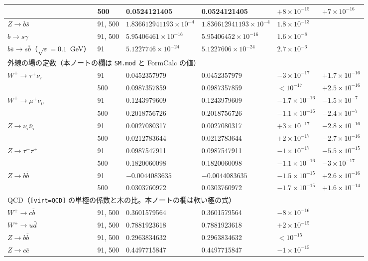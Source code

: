 \documentclass[a4paper,10pt]{ltjsarticle}
\begin{document}
\begin{table}[tbp]
\begin{tabular}{llllll}
 & 500 & 0.0524121405 & 0.0524121405 & $+8\times10^{-15}$ & $+7\times10^{-16}$ \\
\midrule
$Z\to b\bar s$ & 91, 500 & $1.836612941193\times10^{-4}$ & $1.836612941193\times10^{-4}$ & $1.8\times10^{-13}$ & \\
$b\to s\gamma$ & 91, 500 & $5.95406461\times10^{-16}$ & $5.95406452\times10^{-16}$ & $1.6\times10^{-8}$ & \\
$b\bar s\to s\bar b$（$\sqrt s=0.1$~GeV） & 91 & $5.1227746\times10^{-24}$ & $5.1227606\times10^{-24}$ & $2.7\times10^{-6}$ & \\
\midrule
\multicolumn{6}{l}{外線の場の定数（本ノートの欄は \texttt{SM.mod} と FormCalc の値）} \\
$W^+\to\tau^+\nu_\tau$ & 91 & 0.0452357979 & 0.0452357979 & $-3\times10^{-17}$ & $+1.7\times10^{-16}$ \\
 & 500 & 0.0987357859 & 0.0987357859 & $<10^{-17}$ & $+2.5\times10^{-16}$ \\
$W^+\to\mu^+\nu_\mu$ & 91 & 0.1243979609 & 0.1243979609 & $-1.7\times10^{-16}$ & $-1.5\times10^{-7}$ \\
 & 500 & 0.2018756726 & 0.2018756726 & $-1.1\times10^{-16}$ & $-2.4\times10^{-7}$ \\
$Z\to\nu_\tau\bar\nu_\tau$ & 91 & 0.0027080317 & 0.0027080317 & $+3\times10^{-17}$ & $-2.8\times10^{-16}$ \\
 & 500 & 0.0212783644 & 0.0212783644 & $+2\times10^{-17}$ & $-2.7\times10^{-16}$ \\
$Z\to\tau^-\tau^+$ & 91 & 0.0987547911 & 0.0987547911 & $-1\times10^{-17}$ & $-5.5\times10^{-15}$ \\
 & 500 & 0.1820060098 & 0.1820060098 & $-1.1\times10^{-16}$ & $-3\times10^{-17}$ \\
$Z\to b\bar b$ & 91 & $-0.0044083635$ & $-0.0044083635$ & $-1.5\times10^{-15}$ & $+2.6\times10^{-16}$ \\
 & 500 & 0.0303760972 & 0.0303760972 & $-1.7\times10^{-15}$ & $+1.6\times10^{-14}$ \\
\midrule
\multicolumn{6}{l}{QCD（\texttt{[virt=QCD]} の単極の係数と木の比。本ノートの欄は軟い極の式）} \\
$W^+\to c\bar b$ & 91, 500 & 0.3601579564 & 0.3601579564 & $-8\times10^{-16}$ & \\
$W^+\to u\bar d$ & 91, 500 & 0.7881923618 & 0.7881923618 & $+2\times10^{-15}$ & \\
$Z\to b\bar b$ & 91, 500 & 0.2963834632 & 0.2963834632 & $<10^{-15}$ & \\
$Z\to c\bar c$ & 91, 500 & 0.4497715847 & 0.4497715847 & $-1\times10^{-15}$ & \\

\end{tabular}
\end{table}
\end{document}
